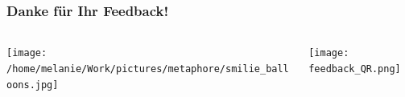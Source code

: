 \documentclass{beamer}
\begin{document}

\begin{frame}
\frametitle{Danke für Ihr Feedback!}

\begin{columns}[c]

\begin{column}{6cm}
\begin{center}
 \texttt{[image: /home/melanie/Work/pictures/metaphore/smilie\_balloons.jpg]}
\end{center}

\end{column}

\begin{column}{4cm}


\begin{center}
 \texttt{[image: feedback\_QR.png]}
\end{center}
\end{column}


\end{columns}

\end{frame}
\end{document}
